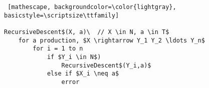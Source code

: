 \documentclass[
    border=0.2cm,
    convert={density=600}
]{standalone}
\begin{document}
\begin{lstlisting} [mathescape, backgroundcolor=\color{lightgray},
basicstyle=\scriptsize\ttfamily]

RecursiveDescent$(X, a)\  // X \in N, a \in T$
    for a production, $X \rightarrow Y_1 Y_2 \ldots Y_n$
        for i = 1 to n
            if $Y_i \in N$)
                RecursiveDescent$(Y_i,a)$
            else if $X_i \neq a$
                error
\end{lstlisting}
\end{document}
